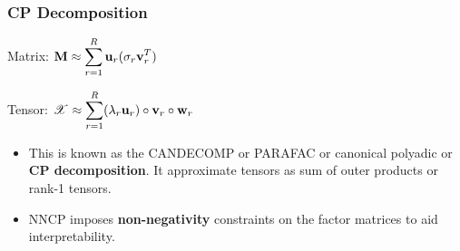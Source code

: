 \documentclass{beamer}
\begin{document}
\begin{frame}
\frametitle{CP Decomposition}
Matrix: \quad $\displaystyle \M{M} \approx \sum_{r=1}^R \MC{U}{r} (\sigma_r \MC{V}{r}^T)$
\begin{center}
\end{center}
\vfill
Tensor: \quad $\displaystyle \T{X}\approx \sum_{r=1}^R (\lambda_r \MC{U}{r})\circ\MC{V}{r}\circ\MC{W}{r}$
\begin{center}
\end{center}
\vfill
\begin{itemize}
\item This is known as the CANDECOMP or PARAFAC or canonical polyadic or \textbf{CP decomposition}. It approximate tensors as sum of outer products or rank-1 tensors.
\item NNCP imposes \textbf{non-negativity} constraints on the factor matrices to aid interpretability.
\end{itemize}
\end{frame}

\end{document}

